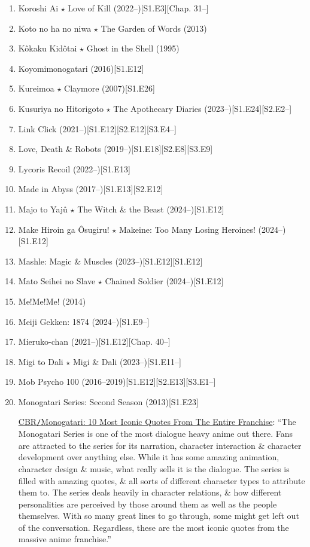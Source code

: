 \documentclass{article}
\begin{document}
\begin{enumerate}
    \item Koroshi Ai $\star$ Love of Kill (2022--)\hfill[S1.E3][Chap. 31--]
    \item {\sc Koto no ha no niwa $\star$ The Garden of Words} (2013)
    \item {\sc K\^okaku Kid\^otai $\star$ Ghost in the Shell} (1995)
    \item {\sc Koyomimonogatari} (2016)\hfill[S1.E12]
    \item {\sc Kureimoa $\star$ Claymore} (2007)\hfill[S1.E26]
    \item {\sc Kusuriya no Hitorigoto $\star$ The Apothecary Diaries} (2023--)\hfill[S1.E24][S2.E2--]
    \item Link Click (2021--)\hfill[S1.E12][S2.E12][S3.E4--]
    \item Love, Death \& Robots (2019--)\hfill[S1.E18][S2.E8][S3.E9]
    \item Lycoris Recoil (2022--)\hfill[S1.E13]
    \item Made in Abyss (2017--)\hfill[S1.E13][S2.E12]
    \item {\sc Majo to Yajû $\star$ The Witch \& the Beast} (2024--)\hfill[S1.E12]
    \item {\sc Make Hiroin ga Ôsugiru! $\star$ Makeine: Too Many Losing Heroines!} (2024--)\hfill[S1.E12]
    \item {\sc Mashle: Magic \& Muscles} (2023--)\hfill[S1.E12][S1.E12]
    \item {\sc Mato Seihei no Slave $\star$ Chained Soldier} (2024--)\hfill[S1.E12]
    \item {\sc Me!Me!Me!} (2014)
    \item Meiji Gekken: 1874 (2024--)\hfill[S1.E9--]
    \item Mieruko-chan (2021--)\hfill[S1.E12][Chap. 40--]
    \item Migi to Dali $\star$ Migi \& Dali (2023--)\hfill[S1.E11--]
    \item Mob Psycho 100 (2016--2019)\hfill[S1.E12][S2.E13][S3.E1--]
    \item {\sc Monogatari Series: Second Season} (2013)\hfill[S1.E23]
    
    \href{https://www.cbr.com/monogatari-series-best-quotes/}{CBR{\tt/}Monogatari: 10 Most Iconic Quotes From The Entire Franchise}: ``The Monogatari Series is one of the most dialogue heavy anime out there. Fans are attracted to the series for its narration, character interaction \& character development over anything else. While it has some amazing animation, character design \& music, what really sells it is the dialogue. The series is filled with amazing quotes, \& all sorts of different character types to attribute them to. The series deals heavily in character relations, \& how different personalities are perceived by those around them as well as the people themselves. With so many great lines to go through, some might get left out of the conversation. Regardless, these are the most iconic quotes from the massive anime franchise.''
    

\end{enumerate}
\end{document}

